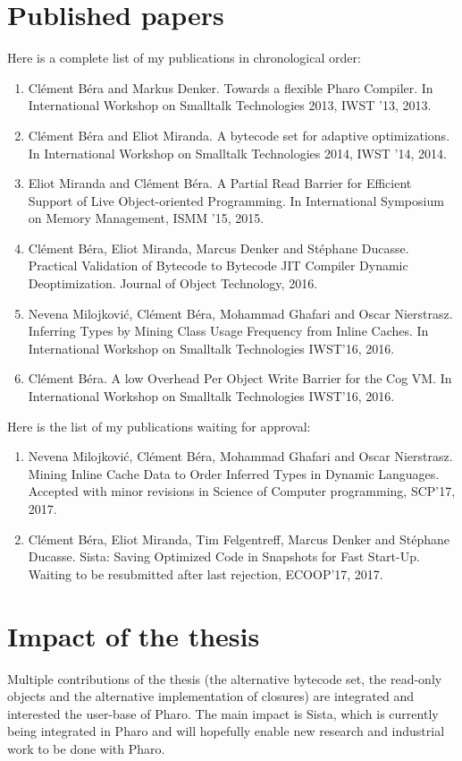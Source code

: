 \documentclass[a4paper,12pt,twoside]{../includes/ThesisStyle}
\begin{document}
\section{Published papers}

Here is a complete list of my publications in chronological order:

\begin{enumerate}
	\item Cl\'ement B\'era and Markus Denker. Towards a flexible Pharo Compiler. In International Workshop on Smalltalk Technologies 2013, IWST '13, 2013.
	\item Cl\'ement B\'era and Eliot Miranda. A bytecode set for adaptive optimizations. In International Workshop on Smalltalk Technologies 2014, IWST '14, 2014.
	\item Eliot Miranda and Cl\'ement B\'era. A Partial Read Barrier for Efficient Support of Live Object-oriented Programming. In International Symposium on Memory Management, ISMM '15, 2015.
	\item Cl\'ement B\'era, Eliot Miranda, Marcus Denker and St\'ephane Ducasse. Practical Validation of Bytecode to Bytecode JIT Compiler Dynamic Deoptimization. Journal of Object Technology, 2016.
	\item Nevena Milojkovi\'c, Cl\'ement B\'era, Mohammad Ghafari and Oscar Nierstrasz. Inferring Types by Mining Class Usage Frequency from Inline Caches. In International Workshop on Smalltalk Technologies IWST'16, 2016.
	\item Cl\'ement B\'era. A low Overhead Per Object Write Barrier for the Cog VM. In International Workshop on Smalltalk Technologies IWST'16, 2016.
\end{enumerate}

Here is the list of my publications waiting for approval:

\begin{enumerate}
	\item Nevena Milojkovi\'c, Cl\'ement B\'era, Mohammad Ghafari and Oscar Nierstrasz. Mining Inline Cache Data to Order Inferred Types in Dynamic Languages. Accepted with minor revisions in Science of Computer programming, SCP'17, 2017.
	\item Cl\'ement B\'era, Eliot Miranda, Tim Felgentreff, Marcus Denker and St\'ephane Ducasse. Sista: Saving Optimized Code in Snapshots for Fast Start-Up. Waiting to be resubmitted after last rejection, ECOOP'17, 2017.
\end{enumerate}

\section{Impact of the thesis}

Multiple contributions of the thesis (the alternative bytecode set, the read-only objects and the alternative implementation of closures) are integrated and interested the user-base of Pharo. The main impact is Sista, which is currently being integrated in Pharo and will hopefully enable new research and industrial work to be done with Pharo.

\ifx\wholebook\relax\else
    
\end{document}
